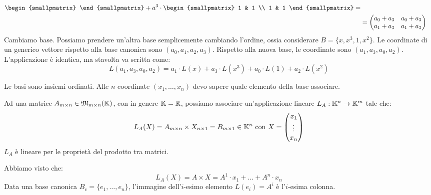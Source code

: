 \begin{exmp}
\begin{align*}
\begin{smallpmatrix}
\end{smallpmatrix} 
+ a^3 \cdot 
\begin{smallpmatrix}
1 & 1 \\ 1 & 1
\end{smallpmatrix} = \\
&=
\begin{pmatrix}
a_0+a_3 & a_0+a_3 \\
a_1+a_3 & a_1+a_3
\end{pmatrix}
\end{align*}
Cambiamo base. Possiamo prendere un'altra base semplicemente cambiando l'ordine, ossia considerare $B = \{ x, x^3, 1, x^2 \}$. Le coordinate di un generico vettore rispetto alla base canonica sono $(a_0, a_1, a_2, a_3)$. Rispetto alla nuova base, le coordinate sono $(a_1, a_3, a_0, a_2)$. L'applicazione \`e identica, ma stavolta va scritta come:
\[
L(a_1, a_3, a_0, a_2) = a_1 \cdot L(x) + a_3 \cdot L(x^3) + a_0 \cdot L(1) + a_2 \cdot L(x^2)
\]
\end{exmp}
Le basi sono insiemi ordinati. Alle $n$ coordinate $(x_{1}, \ldots, x_{n})$ devo sapere quale elemento della base associare.

Ad una matrice $A_{m \times n} \in \mathfrak{M}_{m \times n} ( \mathbb{K} )$, con in genere $\mathbb{K} = \mathbb{R}$, possiamo associare un'applicazione lineare $L_A : \mathbb{K}^n \to \mathbb{K}^m$ tale che:
\[
L_A(X) = A_{m \times n} \times X_{n \times 1} = B_{m \times 1} \in \mathbb{K}^n \text{ con } X = 
\begin{pmatrix}
x_1 \\ \vdots \\ x_n
\end{pmatrix}
\]
$L_A$ \`e lineare per le propriet\`a del prodotto tra matrici.

Abbiamo visto che:
\[
L_A(X) = A \times X = A^1 \cdot x_1 + \ldots + A^n \cdot x_n
\]
Data una base canonica $B_c = \{ e_1, \ldots, e_n \}$, l'immagine dell'$i$-esimo elemento $L(e_i) = A^i$ \`e l'$i$-esima colonna.

